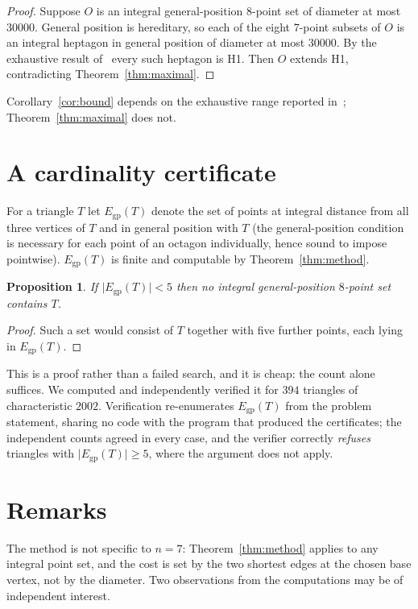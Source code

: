\documentclass[11pt,reqno]{amsart}
\theoremstyle{plain}
\newtheorem{proposition}[theorem]{Proposition}
\numberwithin{equation}{section}
\newcommand{\Egp}{E_{\mathrm{gp}}}
\begin{document}
\begin{proof}
Suppose $O$ is an integral general-position $8$-point set of diameter at most $30000$. General
position is hereditary, so each of the eight $7$-point subsets of $O$ is an integral heptagon in
general position of diameter at most $30000$. By the exhaustive result of~\cite{KK08} every such
heptagon is H1. Then $O$ extends H1, contradicting Theorem~\ref{thm:maximal}.
\end{proof}

Corollary~\ref{cor:bound} depends on the exhaustive range reported in~\cite{KK08};
Theorem~\ref{thm:maximal} does not.

\section{A cardinality certificate}

For a triangle $T$ let $\Egp(T)$ denote the set of points at integral distance from all three vertices
of $T$ and in general position with $T$ (the general-position condition is necessary for each point of
an octagon individually, hence sound to impose pointwise). $\Egp(T)$ is finite and computable by
Theorem~\ref{thm:method}.

\begin{proposition}
If $\lvert\Egp(T)\rvert<5$ then no integral general-position $8$-point set contains $T$.
\end{proposition}

\begin{proof}
Such a set would consist of $T$ together with five further points, each lying in $\Egp(T)$.
\end{proof}

This is a proof rather than a failed search, and it is cheap: the count alone suffices. We computed
and independently verified it for $394$ triangles of characteristic $2002$. Verification re-enumerates
$\Egp(T)$ from the problem statement, sharing no code with the program that produced the certificates;
the independent counts agreed in every case, and the verifier correctly \emph{refuses} triangles with
$\lvert\Egp(T)\rvert\ge 5$, where the argument does not apply.

\section{Remarks}

The method is not specific to $n=7$: Theorem~\ref{thm:method} applies to any integral point set, and
the cost is set by the two shortest edges at the chosen base vertex, not by the diameter. Two
observations from the computations may be of independent interest.
\end{document}
